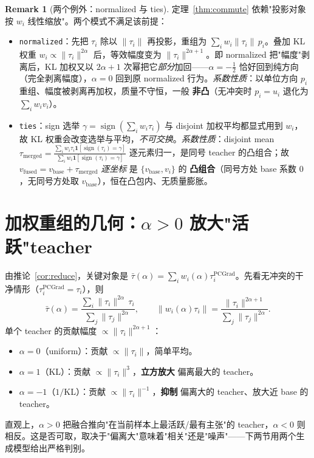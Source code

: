 \documentclass[11pt,a4paper]{article}
\newcommand{\PC}{\mathrm{PCGrad}}
\newcommand{\vb}{v_{\mathrm{base}}}
\newcommand{\vfused}{v_{\mathrm{fused}}}
\newcommand{\norm}[1]{\lVert #1\rVert}
\DeclareMathOperator{\sign}{sign}
\theoremstyle{plain}
\theoremstyle{definition}
\newtheorem{remark}{Remark}
\begin{document}
\begin{remark}[两个例外：normalized 与 ties]
\label{rem:exceptions}
定理~\ref{thm:commute} 依赖"投影对象按 $w_i$ 线性缩放"。两个模式不满足该前提：
\begin{itemize}[leftmargin=1.6em]
\item \texttt{normalized}：先把 $\tau_i$ 除以 $\norm{\tau_i}$ 再投影，重组为 $\sum_i w_i\norm{\tau_i}\,p_i$。叠加 KL 权重 $w_i\propto\norm{\tau_i}^{2\alpha}$ 后，等效幅度变为 $\norm{\tau_i}^{2\alpha+1}$。即 normalized 把"幅度"剥离后，KL 加权又以 $2\alpha+1$ 次幂把它\emph{部分}加回——$\alpha=-\tfrac12$ 恰好回到纯方向（完全剥离幅度），$\alpha=0$ 回到原 normalized 行为。\emph{系数性质}：以单位方向 $p_i$ 重组、幅度被剥离再加权，质量不守恒，一般 \textbf{非凸}（无冲突时 $p_i=u_i$ 退化为 $\sum_i w_i v_i$）。
\item \texttt{ties}：sign 选举 $\gamma=\sign(\sum_i w_i\tau_i)$ 与 disjoint 加权平均都显式用到 $w_i$，故 KL 权重会改变选举与平均，\emph{不可交换}。\emph{系数性质}：disjoint mean $\tau_{\mathrm{merged}}=\frac{\sum_i w_i\tau_i\mathbf{1}[\sign(\tau_i)=\gamma]}{\sum_i w_i\mathbf{1}[\sign(\tau_i)=\gamma]}$ 逐元素归一，是同号 teacher 的凸组合；故 $\vfused=\vb+\tau_{\mathrm{merged}}$ \emph{逐坐标} 是 $\{\vb,v_i\}$ 的 \textbf{凸组合}（同号方处 base 系数 $0$，无同号方处取 $\vb$），恒在凸包内、无质量膨胀。
\end{itemize}
\end{remark}

\section{加权重组的几何：$\alpha>0$ 放大"活跃"teacher}

由推论~\ref{cor:reduce}，关键对象是 $\bar\tau(\alpha)=\sum_i w_i(\alpha)\tau_i^{\PC}$。先看无冲突的干净情形（$\tau_i^{\PC}=\tau_i$），则
\begin{equation}
\bar\tau(\alpha)=\frac{\sum_i \norm{\tau_i}^{2\alpha}\,\tau_i}{\sum_j\norm{\tau_j}^{2\alpha}},\qquad
\norm{w_i(\alpha)\tau_i}=\frac{\norm{\tau_i}^{2\alpha+1}}{\sum_j\norm{\tau_j}^{2\alpha}}.
\label{eq:weighted_combo}
\end{equation}
单个 teacher 的贡献幅度 $\propto\norm{\tau_i}^{2\alpha+1}$：
\begin{itemize}[leftmargin=1.6em]
\item $\alpha=0$（uniform）：贡献 $\propto\norm{\tau_i}$，简单平均。
\item $\alpha=1$（KL）：贡献 $\propto\norm{\tau_i}^{3}$，\textbf{立方放大} 偏离最大的 teacher。
\item $\alpha=-1$（$1/$KL）：贡献 $\propto\norm{\tau_i}^{-1}$，\textbf{抑制} 偏离大的 teacher、放大近 base 的 teacher。
\end{itemize}
直观上，$\alpha>0$ 把融合推向"在当前样本上最活跃/最有主张"的 teacher，$\alpha<0$ 则相反。这是否可取，取决于"偏离大"意味着"相关"还是"噪声"——下两节用两个生成模型给出严格判别。
\end{document}
